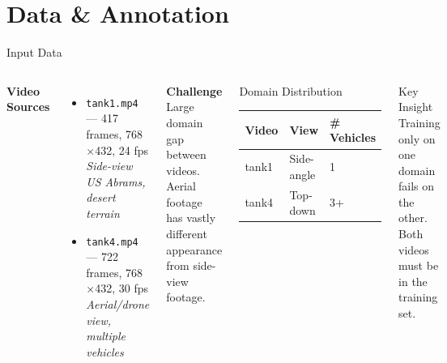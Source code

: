 \documentclass[aspectratio=169]{beamer}
\begin{document}
\section{Data \& Annotation}

\begin{frame}{Input Data}
\begin{columns}[T]
\textbf{Video Sources}
\vspace{0.2cm}
\begin{itemize}
  \item \texttt{tank1.mp4} — 417 frames, 768$\times$432, 24 fps\\
        \textit{Side-view US Abrams, desert terrain}
  \vspace{0.2cm}
  \item \texttt{tank4.mp4} — 722 frames, 768$\times$432, 30 fps\\
        \textit{Aerial/drone view, multiple vehicles}
\end{itemize}
\vspace{0.4cm}
\textbf{Challenge} \\
\small Large domain gap between videos.
Aerial footage has vastly different appearance
from side-view footage.

\begin{block}{Domain Distribution}
\small
\begin{tabular}{lll}
\toprule
Video & View & \# Vehicles \\
\midrule
tank1 & Side-angle & 1 \\
tank4 & Top-down   & 3+ \\
\bottomrule
\end{tabular}
\end{block}
\vspace{0.3cm}
\begin{alertblock}{Key Insight}
\small Training only on one domain fails on the other.
Both videos must be in the training set.
\end{alertblock}
\end{columns}
\end{frame}
\end{document}
